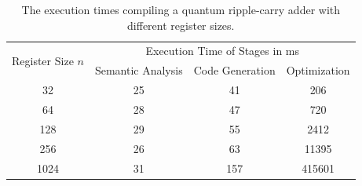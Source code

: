 \begin{table}[htp]
    \centering     
    \begin{tabular}{c|ccc}
    \multirow{2}{*}{Register Size $n$} & \multicolumn{3}{c}{Execution Time of Stages in ms}                                                  \\ \cline{2-4} 
                                       & \multicolumn{1}{c|}{Semantic Analysis} & \multicolumn{1}{c|}{Code Generation} & Optimization \\ \hline
    32                                 & \multicolumn{1}{c|}{25}                & \multicolumn{1}{c|}{41}              & 206          \\
    64                                 & \multicolumn{1}{c|}{28}                & \multicolumn{1}{c|}{47}              & 720          \\
    128                                & \multicolumn{1}{c|}{29}                & \multicolumn{1}{c|}{55}              & 2412         \\
    256                                & \multicolumn{1}{c|}{26}                & \multicolumn{1}{c|}{63}              & 11395        \\
    1024                               & \multicolumn{1}{c|}{31}                & \multicolumn{1}{c|}{157}             & 415601      
    \end{tabular}
    \caption{The execution times compiling a quantum ripple-carry adder with different register sizes.}
    \label{tab:eval_executionTime}
\end{table}